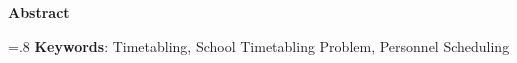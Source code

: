 


\pagestyle{empty}

\begin{latin}

\begin{center}
\textbf{Abstract}
\end{center}
\baselineskip=.8\baselineskip
\bigskip\noindent\textbf{Keywords}:
Timetabling, School Timetabling Problem, Personnel Scheduling
\end{latin}

\newpage
